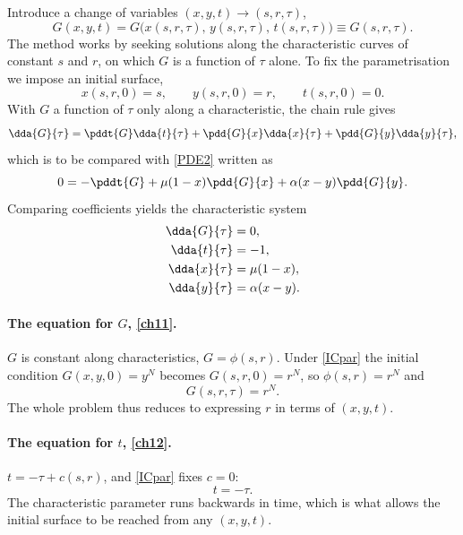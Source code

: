 Introduce a change of variables $(x,y,t)\to(s,r,\tau)$,
\begin{equation*}
G(x,y,t) = G\bigl(x(s,r,\tau),\,y(s,r,\tau),\,t(s,r,\tau)\bigr) \equiv G(s,r,\tau).
\end{equation*}
The method works by seeking solutions along the characteristic curves of constant
$s$ and $r$, on which $G$ is a function of $\tau$ alone. To fix the parametrisation
we impose an initial surface,
\begin{equation}
\label{ICpar}
x(s,r,0) = s, \qquad y(s,r,0) = r, \qquad t(s,r,0) = 0 .
\end{equation}
With $G$ a function of $\tau$ only along a characteristic, the chain rule gives
\begin{equation*}
\dda{G}{\tau} = \pddt{G}\dda{t}{\tau} + \pdd{G}{x}\dda{x}{\tau} + \pdd{G}{y}\dda{y}{\tau},
\end{equation*}
which is to be compared with \cref{PDE2} written as
\begin{equation*}
0 = -\pddt{G} + \mu(1-x)\pdd{G}{x} + \alpha(x-y)\pdd{G}{y} .
\end{equation*}
Comparing coefficients yields the characteristic system
\begin{align}
\dda{G}{\tau} &= 0, \label{ch11}\\
\dda{t}{\tau} &= -1, \label{ch12}\\
\dda{x}{\tau} &= \mu(1-x), \label{ch13}\\
\dda{y}{\tau} &= \alpha(x-y). \label{ch14}
\end{align}

\paragraph{The equation for $G$, \eqref{ch11}.}
$G$ is constant along characteristics, $G = \phi(s,r)$. Under \cref{ICpar} the
initial condition $G(x,y,0)=y^N$ becomes $G(s,r,0)=r^N$, so $\phi(s,r)=r^N$ and
\begin{equation}
\label{GrN}
G(s,r,\tau) = r^N .
\end{equation}
The whole problem thus reduces to expressing $r$ in terms of $(x,y,t)$.

\paragraph{The equation for $t$, \eqref{ch12}.}
$t = -\tau + c(s,r)$, and \cref{ICpar} fixes $c=0$:
\begin{equation}
\label{minustau}
t = -\tau .
\end{equation}
The characteristic parameter runs backwards in time, which is what allows the
initial surface to be reached from any $(x,y,t)$.

